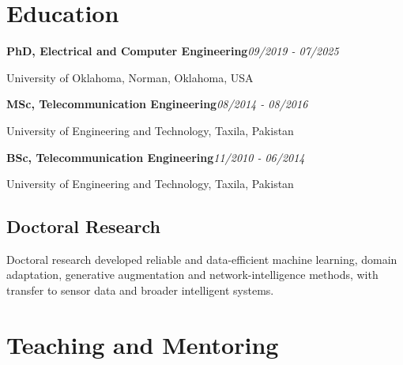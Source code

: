 \documentclass[9pt,letterpaper]{extarticle}
\newcommand{\entry}[2]{\Needspace{4\baselineskip}\textbf{#1}\hfill\textit{#2}\par}
\begin{document}
\section{Education}
\entry{PhD, Electrical and Computer Engineering}{09/2019 - 07/2025}
University of Oklahoma, Norman, Oklahoma, USA\par
\entry{MSc, Telecommunication Engineering}{08/2014 - 08/2016}
University of Engineering and Technology, Taxila, Pakistan\par
\entry{BSc, Telecommunication Engineering}{11/2010 - 06/2014}
University of Engineering and Technology, Taxila, Pakistan\par
{}
\subsection{Doctoral Research}
Doctoral research developed reliable and data-efficient machine learning, domain adaptation, generative augmentation and network-intelligence methods, with transfer to sensor data and broader intelligent systems.\par
{}
\section{Teaching and Mentoring}
\end{document}

